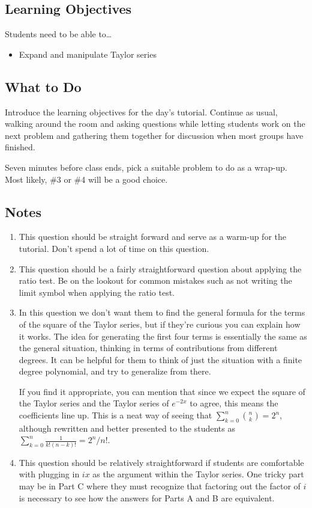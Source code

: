 \subsection*{Learning Objectives} Students need to be able to\ldots
	\begin{itemize}
		\item Expand and manipulate Taylor series
	\end{itemize}

\subsection*{What to Do} 
Introduce the learning objectives for the day's tutorial.
	Continue as usual, walking around the room and asking questions while letting students work on the next problem and gathering them together for discussion when most groups have finished.
    
    Seven minutes before class ends, pick a suitable problem to do as a wrap-up. Most likely, \#3 or \#4 will be a good choice.


\subsection*{Notes}
		\begin{enumerate}
			\item This question should be straight forward and serve
				as a warm-up for the tutorial. Don't spend a lot
				of time on this question.
			\item This question should be a fairly straightforward question about applying the ratio test. Be on the lookout for common mistakes such as not writing the limit symbol when applying the ratio test.

            \item In this question we don't want them to find the general formula for the terms of the square of the Taylor series, but if they're curious you can explain how it works. The idea for generating the first four terms is essentially the same as the general situation, thinking in terms of contributions from different degrees. It can be helpful for them to think of just the situation with a finite degree polynomial, and try to generalize from there. 

            If you find it appropriate, you can mention that since we expect the square of the Taylor series and the Taylor series of $e^{-2x}$ to agree, this means the coefficients line up. This is a neat way of seeing that $\sum_{k=0}^n {n \choose k} = 2^n$, although rewritten and better presented to the students as  $\sum_{k=0}^n \frac{1}{k!(n-k)!} = 2^n/n!$.
            
			\item This question should be relatively straightforward if students are comfortable with plugging in $ix$ as the argument within the Taylor series. One tricky part may be in Part C where they must recognize that factoring out the factor of $i$ is necessary to see how the answers for Parts A and B are equivalent.
		\end{enumerate}
